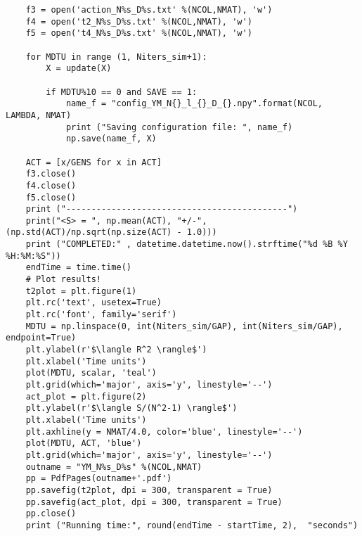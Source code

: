 \begin{lstlisting}
    f3 = open('action_N%s_D%s.txt' %(NCOL,NMAT), 'w')
    f4 = open('t2_N%s_D%s.txt' %(NCOL,NMAT), 'w')
    f5 = open('t4_N%s_D%s.txt' %(NCOL,NMAT), 'w')

    for MDTU in range (1, Niters_sim+1): 
        X = update(X)

        if MDTU%10 == 0 and SAVE == 1:
            name_f = "config_YM_N{}_l_{}_D_{}.npy".format(NCOL, LAMBDA, NMAT)
            print ("Saving configuration file: ", name_f)
            np.save(name_f, X)

    ACT = [x/GENS for x in ACT] 
    f3.close()
    f4.close()
    f5.close()
    print ("--------------------------------------------")
    print("<S> = ", np.mean(ACT), "+/-", (np.std(ACT)/np.sqrt(np.size(ACT) - 1.0)))
    print ("COMPLETED:" , datetime.datetime.now().strftime("%d %B %Y %H:%M:%S")) 
    endTime = time.time() 
    # Plot results!
    t2plot = plt.figure(1) 
    plt.rc('text', usetex=True)
    plt.rc('font', family='serif')
    MDTU = np.linspace(0, int(Niters_sim/GAP), int(Niters_sim/GAP), endpoint=True)
    plt.ylabel(r'$\langle R^2 \rangle$')
    plt.xlabel('Time units')
    plot(MDTU, scalar, 'teal') 
    plt.grid(which='major', axis='y', linestyle='--')
    act_plot = plt.figure(2) 
    plt.ylabel(r'$\langle S/(N^2-1) \rangle$')
    plt.xlabel('Time units')
    plt.axhline(y = NMAT/4.0, color='blue', linestyle='--')
    plot(MDTU, ACT, 'blue') 
    plt.grid(which='major', axis='y', linestyle='--')
    outname = "YM_N%s_D%s" %(NCOL,NMAT)
    pp = PdfPages(outname+'.pdf')
    pp.savefig(t2plot, dpi = 300, transparent = True)
    pp.savefig(act_plot, dpi = 300, transparent = True)
    pp.close()
    print ("Running time:", round(endTime - startTime, 2),  "seconds")
\end{lstlisting}